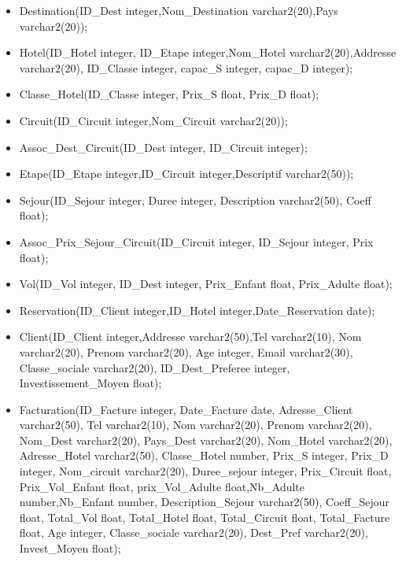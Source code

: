 \begin{itemize}
\item Destination(ID\_Dest integer,Nom\_Destination varchar2(20),Pays varchar2(20));\\
\item Hotel(ID\_Hotel integer, ID\_Etape integer,Nom\_Hotel varchar2(20),Addresse varchar2(20), ID\_Classe integer, capac\_S integer, capac\_D integer);\\
\item Classe\_Hotel(ID\_Classe integer, Prix\_S float, Prix\_D float);\\
\item Circuit(ID\_Circuit integer,Nom\_Circuit varchar2(20));\\
\item Assoc\_Dest\_Circuit(ID\_Dest integer, ID\_Circuit integer);\\
\item Etape(ID\_Etape integer,ID\_Circuit integer,Descriptif varchar2(50));\\
\item Sejour(ID\_Sejour integer, Duree integer, Description varchar2(50), Coeff float);\\
\item Assoc\_Prix\_Sejour\_Circuit(ID\_Circuit integer, ID\_Sejour integer, Prix float);\\
\item Vol(ID\_Vol integer, ID\_Dest integer, Prix\_Enfant float, Prix\_Adulte float);\\
\item Reservation(ID\_Client integer,ID\_Hotel integer,Date\_Reservation date);\\ 
\item Client(ID\_Client integer,Addresse varchar2(50),Tel varchar2(10), Nom varchar2(20), Prenom varchar2(20), Age integer, Email varchar2(30), Classe\_sociale varchar2(20), ID\_Dest\_Preferee integer, Investissement\_Moyen float);\\

\item Facturation(ID\_Facture integer, Date\_Facture date, Adresse\_Client varchar2(50), Tel varchar2(10), Nom varchar2(20), Prenom varchar2(20), Nom\_Dest varchar2(20), Pays\_Dest varchar2(20), Nom\_Hotel varchar2(20), Adresse\_Hotel varchar2(50), Classe\_Hotel number, Prix\_S integer, Prix\_D integer, Nom\_circuit varchar2(20), Duree\_sejour integer, Prix\_Circuit float, Prix\_Vol\_Enfant float, prix\_Vol\_Adulte float,Nb\_Adulte number,Nb\_Enfant number, Description\_Sejour varchar2(50), Coeff\_Sejour float, Total\_Vol float, Total\_Hotel float,  Total\_Circuit float, Total\_Facture float, Age integer, Classe\_sociale varchar2(20), Dest\_Pref varchar2(20), Invest\_Moyen float);\\
\end{itemize}
\newpage

